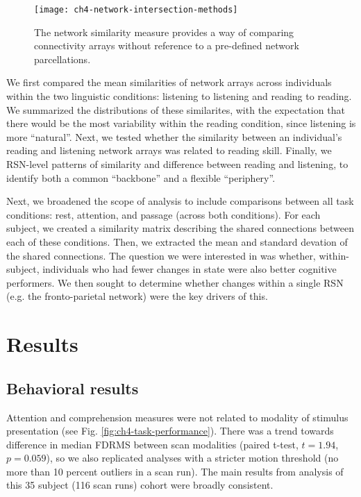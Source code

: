 \begin{figure}[t]
	\centering
	\texttt{[image: ch4-network-intersection-methods]}
    \caption[Method for comparing connectivity arrays.]{The network similarity measure provides a way of comparing connectivity arrays without reference to a pre-defined network parcellations.}
	\label{fig:ch4-network-intersection-methods}
\end{figure}

We first compared the mean similarities of network arrays across individuals within the two linguistic conditions: listening to listening and reading to reading. We summarized the distributions of these similarites, with the expectation that there would be the most variability within the reading condition, since listening is more ``natural''. Next, we tested whether the similarity between an individual's reading and listening network arrays was related to reading skill. Finally, we RSN-level patterns of similarity and difference between reading and listening, to identify both a common ``backbone'' and a flexible ``periphery''. 

Next, we broadened the scope of analysis to include comparisons between all task conditions: rest, attention, and passage (across both conditions). For each subject, we created a similarity matrix describing the shared connections between each of these conditions. Then, we extracted the mean and standard devation of the shared connections. The question we were interested in was whether, within-subject, individuals who had fewer changes in state were also better cognitive performers. We then sought to determine whether changes within a single RSN (e.g. the fronto-parietal network) were the key drivers of this. 



\section{Results}


\subsection{Behavioral results}

Attention and comprehension measures were not related to modality of stimulus presentation (see Fig. \ref{fig:ch4-task-performance}). There was a trend towards difference in median FDRMS between scan modalities (paired t-test, $t = 1.94$, $p = 0.059$), so we also replicated analyses with a stricter motion threshold (no more than 10 percent outliers in a scan run). The main results from analysis of this 35 subject (116 scan runs) cohort were broadly consistent.

